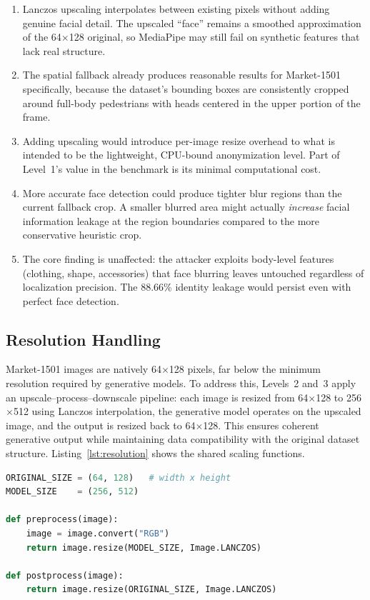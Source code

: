 \begin{enumerate}[noitemsep]
    \item Lanczos upscaling interpolates between existing pixels without adding genuine facial detail. The upscaled ``face'' remains a smoothed approximation of the 64$\times$128 original, so MediaPipe may still fail on synthetic features that lack real structure.
    \item The spatial fallback already produces reasonable results for Market-1501 specifically, because the dataset's bounding boxes are consistently cropped around full-body pedestrians with heads centered in the upper portion of the frame.
    \item Adding upscaling would introduce per-image resize overhead to what is intended to be the lightweight, CPU-bound anonymization level. Part of Level~1's value in the benchmark is its minimal computational cost.
    \item More accurate face detection could produce tighter blur regions than the current fallback crop. A smaller blurred area might actually \textit{increase} facial information leakage at the region boundaries compared to the more conservative heuristic crop.
    \item The core finding is unaffected: the attacker exploits body-level features (clothing, shape, accessories) that face blurring leaves untouched regardless of localization precision. The 88.66\% identity leakage would persist even with perfect face detection.
\end{enumerate}


\subsection{Resolution Handling}
\label{sec:resolution}

Market-1501 images are natively 64$\times$128 pixels, far below the minimum resolution required by generative models. To address this, Levels~2 and~3 apply an upscale--process--downscale pipeline: each image is resized from 64$\times$128 to 256$\times$512 using Lanczos interpolation, the generative model operates on the upscaled image, and the output is resized back to 64$\times$128. This ensures coherent generative output while maintaining data compatibility with the original dataset structure. Listing~\ref{lst:resolution} shows the shared scaling functions.

\begin{lstlisting}[language=Python, caption={Resolution handling (\texttt{anonymizer.py}).}, label=lst:resolution]
ORIGINAL_SIZE = (64, 128)   # width x height
MODEL_SIZE    = (256, 512)

def preprocess(image):
    image = image.convert("RGB")
    return image.resize(MODEL_SIZE, Image.LANCZOS)

def postprocess(image):
    return image.resize(ORIGINAL_SIZE, Image.LANCZOS)
\end{lstlisting}


